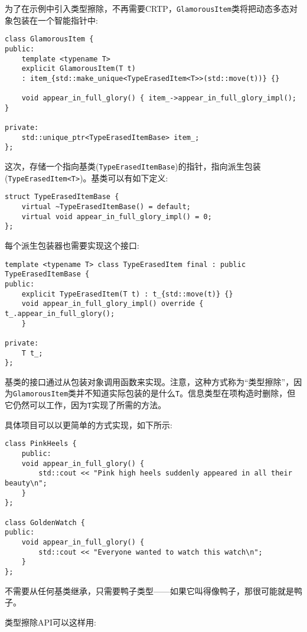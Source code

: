 为了在示例中引入类型擦除，不再需要CRTP，\texttt{GlamorousItem}类将把动态多态对象包装在一个智能指针中:

\begin{lstlisting}[style=styleCXX]
class GlamorousItem {
public:
	template <typename T>
	explicit GlamorousItem(T t)
	: item_{std::make_unique<TypeErasedItem<T>>(std::move(t))} {}
	
	void appear_in_full_glory() { item_->appear_in_full_glory_impl(); }
	
private:
	std::unique_ptr<TypeErasedItemBase> item_;
};
\end{lstlisting}

这次，存储一个指向基类(\texttt{TypeErasedItemBase})的指针，指向派生包装(\texttt{TypeErasedItem<T>})。基类可以有如下定义:

\begin{lstlisting}[style=styleCXX]
struct TypeErasedItemBase {
	virtual ~TypeErasedItemBase() = default;
	virtual void appear_in_full_glory_impl() = 0;
};
\end{lstlisting}

每个派生包装器也需要实现这个接口:

\begin{lstlisting}[style=styleCXX]
template <typename T> class TypeErasedItem final : public
TypeErasedItemBase {
public:
	explicit TypeErasedItem(T t) : t_{std::move(t)} {}
	void appear_in_full_glory_impl() override { t_.appear_in_full_glory();
	}

private:
	T t_;
};
\end{lstlisting}

基类的接口通过从包装对象调用函数来实现。注意，这种方式称为“类型擦除”，因为\texttt{GlamorousItem}类并不知道实际包装的是什么\texttt{T}。信息类型在项构造时删除，但它仍然可以工作，因为\texttt{T}实现了所需的方法。

具体项目可以以更简单的方式实现，如下所示:

\begin{lstlisting}[style=styleCXX]
class PinkHeels {
	public:
	void appear_in_full_glory() {
		std::cout << "Pink high heels suddenly appeared in all their beauty\n";
    }
};

class GoldenWatch {
public:
	void appear_in_full_glory() {
		std::cout << "Everyone wanted to watch this watch\n";
	}
};
\end{lstlisting}

不需要从任何基类继承，只需要鸭子类型——如果它叫得像鸭子，那很可能就是鸭子。

类型擦除API可以这样用:


